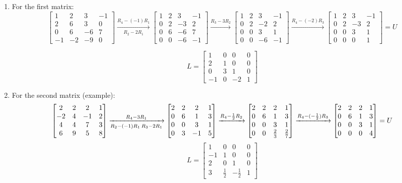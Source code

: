 \documentclass[11pt]{article} %
\begin{document}
\begin{enumerate}
	\item For the first matrix:
	$$\begin{bmatrix}
		1&2&3&-1\\
		2&6&3&0\\
		0&6&-6&7\\
		-1&-2&-9&0
	\end{bmatrix}\xrightarrow[R_2-2R_1]{R_4-(-1)R_1}
\begin{bmatrix}
	1&2&3&-1\\
	0&2&-3&2\\
	0&6&-6&7\\
	0&0&-6&-1
\end{bmatrix}\xrightarrow{R_3-3R_2}\begin{bmatrix}
1&2&3&-1\\
0&2&-2&2\\
0&0&3&1\\
0&0&-6&-1
\end{bmatrix}\xrightarrow{R_4-(-2)R_3}\begin{bmatrix}
1&2&3&-1\\
0&2&-3&2\\
0&0&3&1\\
0&0&0&1
\end{bmatrix}=U$$

$$L=\begin{bmatrix}
	1&0&0&0\\
	2&1&0&0\\
	0&3&1&0\\
	-1&0&-2&1
\end{bmatrix}$$

\item For the second matrix (example):
$$\begin{bmatrix}
	2&2&2&1\\
	-2&4&-1&2\\
	4&4&7&3\\
	6&9&5&8
\end{bmatrix}\xrightarrow[R_2-(-1)R_1\\
R_3-2R_1]{R_4-3R_1}\begin{bmatrix}
	2&2&2&1\\
	0&6&1&3\\
	0&0&3&1\\
	0&3&-1&5
\end{bmatrix}\xrightarrow{R_4-\frac{1}{2}R_2}\begin{bmatrix}
2&2&2&1\\
0&6&1&3\\
0&0&3&1\\
0&0&\frac{2}{3}&\frac{2}{7}
\end{bmatrix}\xrightarrow{R_4-(-\frac{1}{2})R_3}\begin{bmatrix}
	2&2&2&1\\
	0&6&1&3\\
	0&0&3&1\\
	0&0&0&4
\end{bmatrix}=U$$
$$L=\begin{bmatrix}
	1&0&0&0\\
	-1&1&0&0\\
	2&0&1&0\\
	3&\frac{1}{2}&-\frac{1}{2}&1
\end{bmatrix}$$



\end{enumerate}
\end{document}
